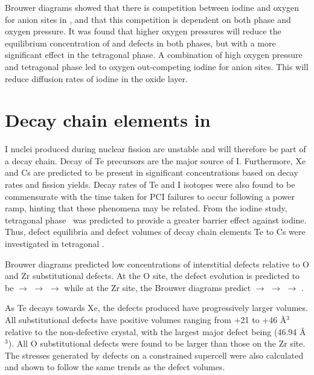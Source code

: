 Brouwer diagrams showed that there is competition between iodine and oxygen for anion sites in \zirconia , and that this competition is dependent on both phase and oxygen pressure. It was found that higher oxygen pressures will reduce the equilibrium concentration of  and  defects in both phases, but with a more significant effect in the tetragonal phase. A combination of high oxygen pressure and tetragonal phase led to oxygen out-competing iodine for anion sites. This will reduce diffusion rates of iodine in the oxide layer.


\section{Decay chain elements in \zirconia}

I nuclei produced during nuclear fission are unstable and will therefore be part of a decay chain. Decay of Te precursors are the major source of I. Furthermore, Xe and Cs are predicted to be present in significant concentrations based on decay rates and fission yields. Decay rates of Te and I isotopes were also found to be commensurate with the time taken for PCI failures to occur following a power ramp, hinting that these phenomena may be related. From the iodine study, tetragonal phase \zirconia\ was predicted to provide a greater barrier effect against iodine. Thus, defect equilibria and defect volumes of decay chain elements Te to Cs were investigated in tetragonal \zirconia . 

Brouwer diagrams predicted low concentrations of interstitial defects relative to O and Zr substitutional defects. At the O site, the defect evolution is predicted to be  $\rightarrow$  $\rightarrow$  $\rightarrow$  while at the Zr site, the Brouwer diagrams predict  $\rightarrow$  $\rightarrow$  $\rightarrow$ .

As Te decays towards Xe, the defects produced have progressively larger volumes. All substitutional defects have positive volumes ranging from +21 to +46 \r{A}$^{3}$ relative to the non-defective crystal, with the largest major defect being  (46.94 \r{A}$^{3}$). All O substitutional defects were found to be larger than those on the Zr site. The stresses generated by defects on a constrained supercell were also calculated and shown to follow the same trends as the defect volumes.

